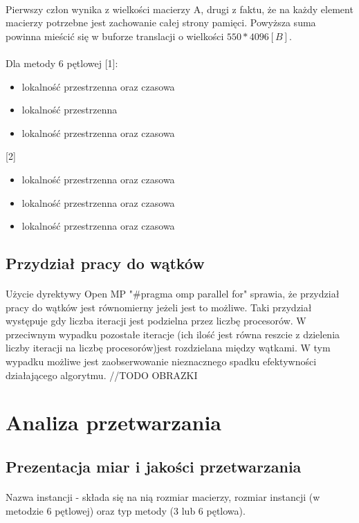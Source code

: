 \documentclass{scrartcl}
\begin{document}
\paragraph{}Pierwszy człon wynika z wielkości macierzy A, drugi z faktu, że na każdy element macierzy potrzebne jest zachowanie całej strony pamięci. Powyższa suma powinna mieścić się w buforze translacji o wielkości $550 * 4096[B]$.
\paragraph{}
Dla metody 6 pętlowej [1]:
\begin{itemize}
\item lokalność przestrzenna oraz czasowa
\item lokalność przestrzenna
\item lokalność przestrzenna oraz czasowa
\end{itemize}
[2]
\begin{itemize}
\item lokalność przestrzenna oraz czasowa
\item lokalność przestrzenna oraz czasowa
\item lokalność przestrzenna oraz czasowa
\end{itemize}
\subsection{Przydział pracy do wątków}
\paragraph{}Użycie dyrektywy Open MP "\#pragma omp parallel for" sprawia, że przydział pracy do wątków jest równomierny jeżeli jest to możliwe. Taki przydział występuje gdy liczba iteracji jest podzielna przez liczbę procesorów. W przeciwnym wypadku pozostałe iteracje (ich ilość jest równa reszcie z dzielenia liczby iteracji na liczbę procesorów)jest rozdzielana między wątkami. W tym wypadku możliwe jest zaobserwowanie nieznacznego spadku efektywności działającego algorytmu.
//TODO OBRAZKI
\section{Analiza przetwarzania}
\subsection{Prezentacja miar i jakości przetwarzania}
\paragraph{}
 Nazwa instancji - składa się na nią rozmiar macierzy, rozmiar instancji (w metodzie 6 pętlowej) oraz typ metody (3 lub 6 pętlowa).
\end{document}
